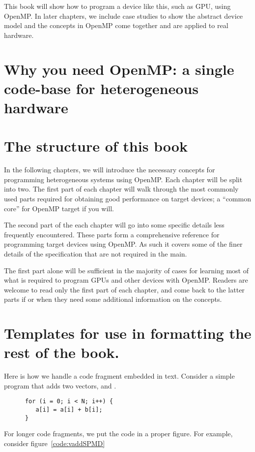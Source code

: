 This book will show how to program a device like this, such as GPU, using OpenMP.
In later chapters, we include case studies to show the abstract device model and the concepts in OpenMP come together and are applied to real hardware.


\section{Why you need OpenMP: a single code-base for heterogeneous hardware}

\section{The structure of this book}
In the following chapters, we will introduce the necessary concepts for programming heterogeneous systems using OpenMP.
Each chapter will be split into two.
The first part of each chapter will walk through the most commonly used parts required for obtaining good performance on target devices; a ``common core'' for OpenMP target if you will.

The second part of the each chapter will go into some specific details less frequently encountered.
These parts form a comprehensive reference for programming target devices using OpenMP.
As such it covers some of the finer details of the specification that are not required in the main.

The first part alone will be sufficient in the majority of cases for learning most of what is required to program GPUs and other devices with OpenMP.
Readers are welcome to read only the first part of each chapter, and come back to the latter parts if or when they need some additional information on the concepts.


\section{Templates for use in formatting the rest of the book.}

Here is how we handle a code fragment embedded in text.
Consider a simple program that adds two vectors,  and .
\begin{verbatim}
      for (i = 0; i < N; i++) { 
         a[i] = a[i] + b[i];
      }
\end{verbatim}  

For longer code fragments, we put the code in a proper figure.  For example, consider figure~\ref{code:vaddSPMD}

